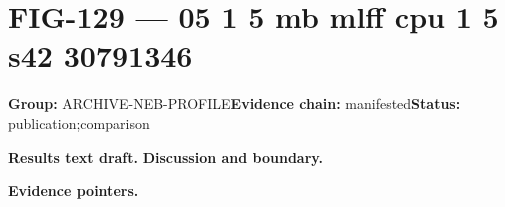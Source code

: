 \clearpage
\section{FIG-129 --- 05 1 5 mb mlff cpu 1 5 s42 30791346}
\label{figpage:fig-129}
\textbf{Group:} ARCHIVE-NEB-PROFILE\quad \textbf{Evidence chain:} manifested\quad \textbf{Status:} publication;comparison

\textbf{Results text draft.} 
\textbf{Discussion and boundary.} 


\textbf{Evidence pointers.}



\vfill
